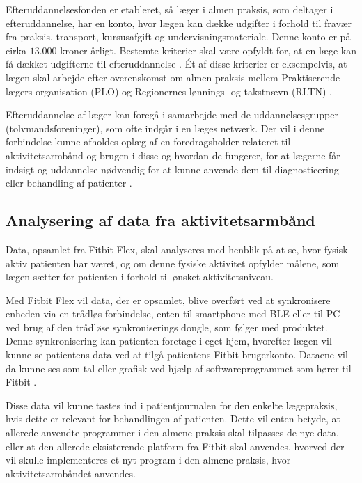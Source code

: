 Efteruddannelsesfonden er etableret, så læger i almen praksis, som deltager i efteruddannelse, har en konto, hvor lægen kan dække udgifter i forhold til fravær fra praksis, transport, kursusafgift og undervisningsmateriale. Denne konto er på cirka $13.000$ kroner årligt. Bestemte kriterier skal være opfyldt for, at en læge kan få dækket udgifterne til efteruddannelse \citep{vedsted2005}. Ét af disse kriterier er eksempelvis, at lægen skal arbejde efter overenskomst om almen praksis mellem Praktiserende lægers organisation (PLO) og Regionernes lønnings- og takstnævn (RLTN) \citep{fondenforalmenpraksis2016}. 

Efteruddannelse af læger kan foregå i samarbejde med de uddannelsesgrupper (tolvmandsforeninger), som ofte indgår i en læges netværk. Der vil i denne forbindelse kunne afholdes oplæg af en foredragsholder relateret til aktivitetsarmbånd og brugen i disse og hvordan de fungerer, for at lægerne får indsigt og uddannelse nødvendig for at kunne anvende dem til diagnosticering eller behandling af patienter \citep{vedsted2005}. 

\subsection{Analysering af data fra aktivitetsarmbånd}  
Data, opsamlet fra Fitbit Flex, skal analyseres med henblik på at se, hvor fysisk aktiv patienten har været, og om denne fysiske aktivitet opfylder målene, som lægen sætter for patienten i forhold til ønsket aktivitetsniveau. 

Med Fitbit Flex vil data, der er opsamlet, blive overført ved at synkronisere enheden via en trådløs forbindelse, enten til smartphone med BLE eller til PC ved brug af den trådløse synkroniserings dongle, som følger med produktet. Denne synkronisering kan patienten foretage i eget hjem, hvorefter lægen vil kunne se patientens data  ved at tilgå patientens Fitbit brugerkonto. Dataene vil da kunne ses som tal eller grafisk ved hjælp af softwareprogrammet som hører til Fitbit \citep{fitbitflex}. 

Disse data vil kunne tastes ind i patientjournalen for den enkelte lægepraksis, hvis dette er relevant for behandlingen af patienten. Dette vil enten betyde, at allerede anvendte programmer i den almene praksis skal tilpasses de nye data, eller at den allerede eksisterende platform fra Fitbit skal anvendes, hvorved der vil skulle implementeres et nyt program i den almene praksis, hvor aktivitetsarmbåndet anvendes. 

